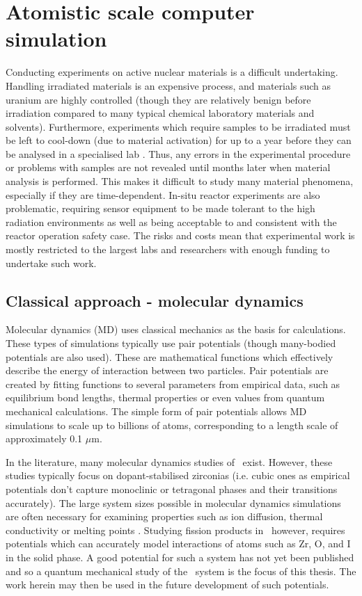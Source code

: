 \section{Atomistic scale computer simulation}

Conducting experiments on active nuclear materials is a difficult undertaking. Handling irradiated materials is an expensive process, and materials such as uranium are highly controlled (though they are relatively benign before irradiation compared to many typical chemical laboratory materials and solvents). Furthermore, experiments which require samples to be irradiated must be left to cool-down (due to material activation) for up to a year before they can be analysed in a specialised lab \cite{efthymiopoulos2011hiradmat}. Thus, any errors in the experimental procedure or problems with samples are not revealed until months later when material analysis is performed. This makes it difficult to study many material phenomena, especially if they are time-dependent. In-situ reactor experiments are also problematic, requiring sensor equipment to be made tolerant to the high radiation environments as well as being acceptable to and consistent with the reactor operation safety case. The risks and costs mean that experimental work is mostly restricted to the largest labs and researchers with enough funding to undertake such work.

\subsection{Classical approach - molecular dynamics}

Molecular dynamics (MD) uses classical mechanics as the basis for calculations. These types of simulations typically use pair potentials (though many-bodied potentials are also used). These are mathematical functions which effectively describe the energy of interaction between two particles. Pair potentials are created by fitting functions to several parameters from empirical data, such as equilibrium bond lengths, thermal properties or even values from quantum mechanical calculations. The simple form of pair potentials allows MD simulations to scale up to billions of atoms, corresponding to a length scale of approximately 0.1 $\mu$m. 

In the literature, many molecular dynamics studies of \zirconia\ exist. However, these studies typically focus on dopant-stabilised zirconias (i.e. cubic ones as empirical potentials don't capture monoclinic or tetragonal phases and their transitions accurately). The large system sizes possible in molecular dynamics simulations are often necessary for examining properties such as ion diffusion, thermal conductivity or melting points \cite{Davis2010}. Studying fission products in \zirconia\ however, requires potentials which can accurately model interactions of atoms such as Zr, O, and I in the solid phase. A good potential for such a system has not yet been published and so a quantum mechanical study of the \zirconia\ system is the focus of this thesis. The work herein may then be used in the future development of such potentials.


